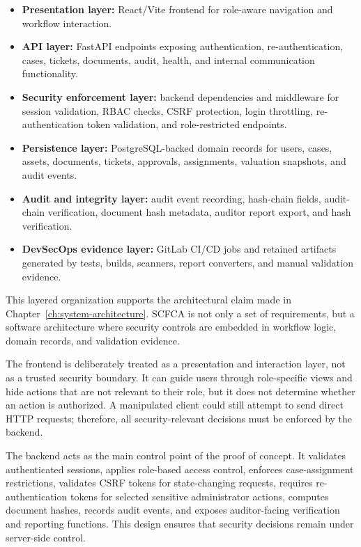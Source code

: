 \documentclass[12pt,a4paper]{report}
\begin{document}
\begin{itemize}
    \item \textbf{Presentation layer:} React/Vite frontend for role-aware navigation and workflow interaction.
    \item \textbf{API layer:} FastAPI endpoints exposing authentication, re-authentication, cases, tickets, documents, audit, health, and internal communication functionality.
    \item \textbf{Security enforcement layer:} backend dependencies and middleware for session validation, RBAC checks, CSRF protection, login throttling, re-authentication token validation, and role-restricted endpoints.
    \item \textbf{Persistence layer:} PostgreSQL-backed domain records for users, cases, assets, documents, tickets, approvals, assignments, valuation snapshots, and audit events.
    \item \textbf{Audit and integrity layer:} audit event recording, hash-chain fields, audit-chain verification, document hash metadata, auditor report export, and hash verification.
    \item \textbf{DevSecOps evidence layer:} GitLab CI/CD jobs and retained artifacts generated by tests, builds, scanners, report converters, and manual validation evidence.
\end{itemize}

This layered organization supports the architectural claim made in Chapter~\ref{ch:system-architecture}. SCFCA is not only a set of requirements, but a software architecture where security controls are embedded in workflow logic, domain records, and validation evidence.

The frontend is deliberately treated as a presentation and interaction layer, not as a trusted security boundary. It can guide users through role-specific views and hide actions that are not relevant to their role, but it does not determine whether an action is authorized. A manipulated client could still attempt to send direct HTTP requests; therefore, all security-relevant decisions must be enforced by the backend.

The backend acts as the main control point of the proof of concept. It validates authenticated sessions, applies role-based access control, enforces case-assignment restrictions, validates CSRF tokens for state-changing requests, requires re-authentication tokens for selected sensitive administrator actions, computes document hashes, records audit events, and exposes auditor-facing verification and reporting functions. This design ensures that security decisions remain under server-side control.
\end{document}
